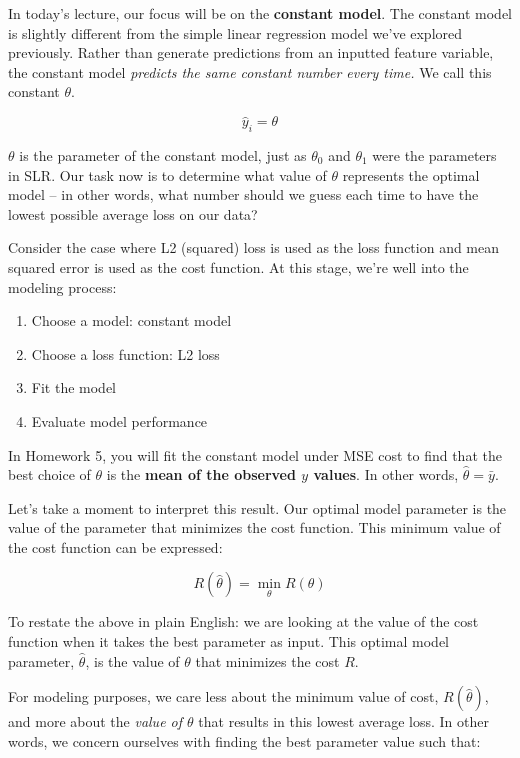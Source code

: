 \documentclass[
  letterpaper,
  DIV=11,
  numbers=noendperiod]{scrreprt}
\providecommand{\tightlist}{%
  \setlength{\itemsep}{0pt}\setlength{\parskip}{0pt}}\usepackage{longtable,booktabs,array}
\begin{document}
In today's lecture, our focus will be on the \textbf{constant model}.
The constant model is slightly different from the simple linear
regression model we've explored previously. Rather than generate
predictions from an inputted feature variable, the constant model
\emph{predicts the same constant number every time.} We call this
constant \(\theta\).

\[\hat{y}_i = \theta\]

\(\theta\) is the parameter of the constant model, just as \(\theta_0\)
and \(\theta_1\) were the parameters in SLR. Our task now is to
determine what value of \(\theta\) represents the optimal model -- in
other words, what number should we guess each time to have the lowest
possible average loss on our data?

Consider the case where L2 (squared) loss is used as the loss function
and mean squared error is used as the cost function. At this stage,
we're well into the modeling process:

\begin{enumerate}
\def\labelenumi{\arabic{enumi}.}
\tightlist
\item
  Choose a model: constant model
\item
  Choose a loss function: L2 loss
\item
  Fit the model
\item
  Evaluate model performance
\end{enumerate}

In Homework 5, you will fit the constant model under MSE cost to find
that the best choice of \(\theta\) is the \textbf{mean of the observed
\(y\) values}. In other words, \(\hat{\theta} = \bar{y}\).

Let's take a moment to interpret this result. Our optimal model
parameter is the value of the parameter that minimizes the cost
function. This minimum value of the cost function can be expressed:

\[R(\hat{\theta}) = \min_{\theta} R(\theta)\]

To restate the above in plain English: we are looking at the value of
the cost function when it takes the best parameter as input. This
optimal model parameter, \(\hat{\theta}\), is the value of \(\theta\)
that minimizes the cost \(R\).

For modeling purposes, we care less about the minimum value of cost,
\(R(\hat{\theta})\), and more about the \emph{value of \(\theta\)} that
results in this lowest average loss. In other words, we concern
ourselves with finding the best parameter value such that:
\end{document}
